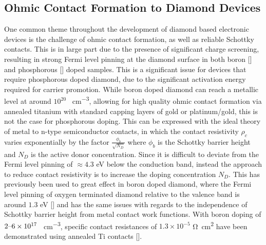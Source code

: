 \subsection{Ohmic Contact Formation to Diamond Devices}
One common theme throughout the development of diamond based electronic devices is the challenge of ohmic contact formation, as well as reliable Schottky contacts. This is in large part due to the presence of significant charge screening, resulting in strong Fermi level pinning at the diamond surface in both boron [\cite{baker1993}] and phosphorous [\cite{suzuki2006}] doped samples. This is a significant issue for devices that require phosphorous doped diamond, due to the significant activation energy required for carrier promotion. While boron doped diamond can reach a metallic level at around $10^{20}$ \si{\atoms\per\centi\metre\cubed}, allowing for high quality ohmic contact formation via annealed titanium with standard capping layers of gold or platinum/gold, this is not the case for phosphorous doping. This can be expressed with the ideal theory of metal to n-type semiconductor contacts, in which the contact resistivity $\rho_{c}$ varies exponentially by the factor $\frac{\phi_{b}}{\sqrt{N_{D}}}$ where $\phi_{b}$ is the Schottky barrier height and $N_{D}$ is the active donor concentration. Since it is difficult to deviate from the Fermi level pinning of $\approx4.3$ \si{\electronvolt} below the conduction band, instead the approach to reduce contact resistivity is to increase the doping concentration $N_{D}$. This has previously been used to great effect in boron doped diamond, where the Fermi level pinning of oxygen terminated diamond relative to the valence band is around $1.3$ \si{\electronvolt} [\cite{yamanaka2000}] and has the same issues with regards to the independence of Schottky barrier height from metal contact work functions. With boron doping of $2\text{\textendash}6\times10^{17}$ \si{\atoms\per\centi\metre\cubed}, specific contact resistances of $1.3\times10^{-5}$ \si{\ohm\centi\metre\squared} have been demonstrated using annealed Ti contacts [\cite{chen2005}].

